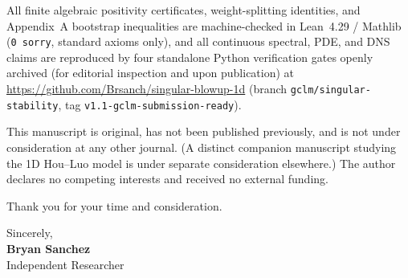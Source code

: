 \documentclass[10.5pt,letterpaper]{article}
\begin{document}
All finite algebraic positivity certificates, weight-splitting identities, and Appendix~A bootstrap inequalities are machine-checked in Lean~4.29 / Mathlib (\texttt{0~sorry}, standard axioms only), and all continuous spectral, PDE, and DNS claims are reproduced by four standalone Python verification gates openly archived (for editorial inspection and upon publication) at \url{https://github.com/Brsanch/singular-blowup-1d} (branch \texttt{gclm/singular-stability}, tag \texttt{v1.1-gclm-submission-ready}).

This manuscript is original, has not been published previously, and is not under consideration at any other journal. (A distinct companion manuscript studying the 1D Hou--Luo model is under separate consideration elsewhere.) The author declares no competing interests and received no external funding.

Thank you for your time and consideration.

\vspace{0.3em}
Sincerely,\\[0.2em]
\textbf{Bryan Sanchez}\\
Independent Researcher
\end{document}
